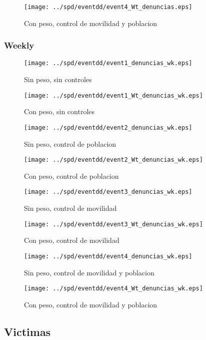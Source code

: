 \documentclass[11pt,letterpaper]{article}
\begin{document}
\begin{figure}[hbtp]
\caption{Con peso, control de movilidad y poblacion}
\centering
\texttt{[image: ../spd/eventdd/event4\_Wt\_denuncias.eps]}
\end{figure}

		\subsubsection{Weekly}
\begin{figure}[hbtp]
\caption{Sin peso, sin controles}
\centering
\texttt{[image: ../spd/eventdd/event1\_denuncias\_wk.eps]}
\end{figure}

\begin{figure}[hbtp]
\caption{Con peso, sin controles}
\centering
\texttt{[image: ../spd/eventdd/event1\_Wt\_denuncias\_wk.eps]}
\end{figure}
\begin{figure}[hbtp]
\caption{Sin peso, control de poblacion}
\centering
\texttt{[image: ../spd/eventdd/event2\_denuncias\_wk.eps]}
\end{figure}

\begin{figure}[hbtp]
\caption{Con peso, control de poblacion}
\centering
\texttt{[image: ../spd/eventdd/event2\_Wt\_denuncias\_wk.eps]}
\end{figure}
\begin{figure}[hbtp]
\caption{Sin peso, control de movilidad}
\centering
\texttt{[image: ../spd/eventdd/event3\_denuncias\_wk.eps]}
\end{figure}

\begin{figure}[hbtp]
\caption{Con peso, control de movilidad}
\centering
\texttt{[image: ../spd/eventdd/event3\_Wt\_denuncias\_wk.eps]}
\end{figure}
\begin{figure}[hbtp]
\caption{Sin peso, control de movilidad y poblacion}
\centering
\texttt{[image: ../spd/eventdd/event4\_denuncias\_wk.eps]}
\end{figure}

\begin{figure}[hbtp]
\caption{Con peso, control de movilidad y poblacion}
\centering
\texttt{[image: ../spd/eventdd/event4\_Wt\_denuncias\_wk.eps]}
\end{figure}
	\subsection{Victimas}
\end{document}
